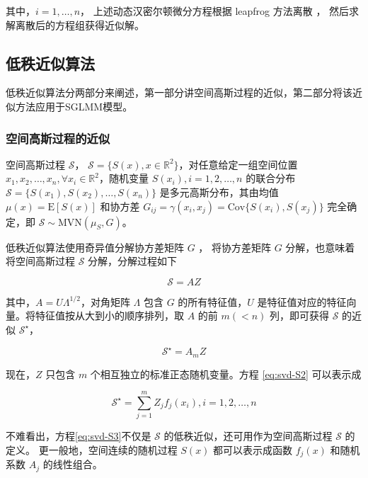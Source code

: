 \documentclass[12pt,a4paper,UTF8,twoside]{book}
\theoremstyle{definition}
\theoremstyle{definition}
\theoremstyle{definition}
\theoremstyle{remark}
\begin{document}
\noindent 其中，\(i = 1,\ldots, n\)， 上述动态汉密尔顿微分方程根据
leapfrog 方法离散 \citep{Brooks2011}，
然后求解离散后的方程组获得近似解。

\hypertarget{LowRank}{%
\subsection{低秩近似算法}\label{LowRank}}

低秩近似算法分两部分来阐述，第一部分讲空间高斯过程的近似，第二部分将该近似方法应用于SGLMM模型。

\hypertarget{low-rank-gp}{%
\subsubsection{空间高斯过程的近似}\label{low-rank-gp}}

空间高斯过程 \(\mathcal{S}\)，
\(\mathcal{S} = \{S(x),x\in\mathbb{R}^2\}\)，对任意给定一组空间位置
\(x_1,x_2,\ldots,x_n, \forall x_{i} \in \mathbb{R}^2\)，随机变量
\(S(x_i),i = 1,2,\ldots,n\) 的联合分布
\(\mathcal{S}=\{S(x_1),S(x_2),\ldots,S(x_n)\}\) 是多元高斯分布，其由均值
\(\mu(x) = \mathrm{E}[S(x)]\) 和协方差
\(G_{ij} =\gamma(x_i,x_j)= \mathrm{Cov}\{S(x_i),S(x_j)\}\) 完全确定，即
\(\mathcal{S} \sim \mathrm{MVN}(\mu_{S},G)\)。

低秩近似算法使用奇异值分解协方差矩阵 \(G\) \citep{Diggle2007}，
将协方差矩阵 \(G\) 分解，也意味着将空间高斯过程 \(\mathcal{S}\)
分解，分解过程如下

\begin{equation}
\mathcal{S} = AZ \label{eq:svd-S1}
\end{equation}

\noindent 其中，\(A = U\Lambda^{1/2}\)，对角矩阵 \(\Lambda\) 包含 \(G\)
的所有特征值，\(U\)
是特征值对应的特征向量。将特征值按从大到小的顺序排列，取 \(A\) 的前
\(m(<n)\) 列，即可获得 \(\mathcal{S}\) 的近似 \(\mathcal{S}^{\star}\)，

\begin{equation}
\mathcal{S}^{\star} = A_{m}Z \label{eq:svd-S2}
\end{equation}

\noindent 现在，\(Z\) 只包含 \(m\) 个相互独立的标准正态随机变量。方程
\eqref{eq:svd-S2} 可以表示成

\begin{equation}
\mathcal{S}^{\star} = \sum_{j=1}^{m}Z_{j}f_{j}(x_{i}), i = 1,2,\ldots,n \label{eq:svd-S3}
\end{equation}

\noindent 不难看出，方程\eqref{eq:svd-S3}不仅是 \(\mathcal{S}\)
的低秩近似，还可用作为空间高斯过程 \(\mathcal{S}\) 的定义。
更一般地，空间连续的随机过程 \(S(x)\) 都可以表示成函数 \(f_{j}(x)\)
和随机系数 \(A_{j}\) 的线性组合。
\end{document}
